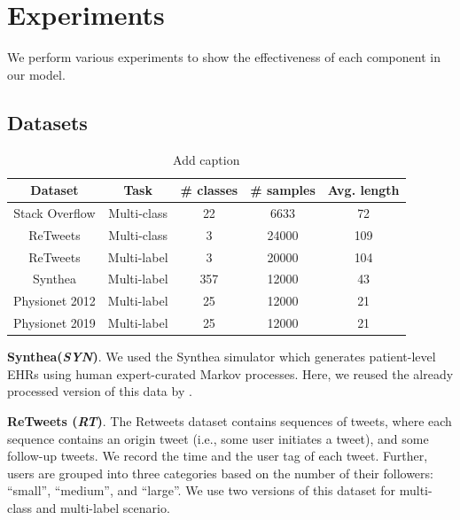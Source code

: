 \documentclass[journal,twoside,web]{ieeecolor}
\begin{document}
\section{Experiments}
\label{sec:Experiments}

We perform various experiments to show the effectiveness of each component in our model.
\subsection*{Datasets}

\begin{table}[htbp]
    \centering
    \caption{Add caption}
      \begin{tabular}{ccccc}
      \toprule
      \toprule
      Dataset & Task  & \# classes & \# samples & Avg. length \\
      \midrule
      Stack Overflow & Multi-class & 22    & 6633  & 72 \\
      ReTweets & Multi-class & 3     & 24000 & 109 \\
      ReTweets & Multi-label & 3     & 20000 & 104 \\
      Synthea & Multi-label & 357   & 12000 & 43 \\
      Physionet 2012 & Multi-label & 25    & 12000 & 21 \\
      Physionet 2019 & Multi-label & 25    & 12000 & 21 \\
      \bottomrule
      \bottomrule
      \end{tabular}%
    \label{tab:data}%

  \end{table}%
  
  
  
  

\textbf{Synthea(\emph{SYN})}.
We used the Synthea simulator \cite*{walonoskiSyntheaApproachMethod2018} which generates patient-level EHRs using human expert-curated Markov processes. Here, we reused the already processed version of this data by \cite*{enguehardNeuralTemporalPoint2020}.

\textbf{ReTweets (\emph{RT})}.
The Retweets dataset contains sequences of tweets, where each sequence contains an origin tweet (i.e., some user initiates a tweet), and some follow-up tweets. We record the time and the user tag of each tweet. Further, users are grouped into three categories based on the number of their followers: “small”, “medium”, and “large”. We use two versions of this dataset for multi-class \cite*{zhangSelfAttentiveHawkesProcess2020} and multi-label \cite*{enguehardNeuralTemporalPoint2020} scenario.
\end{document}
